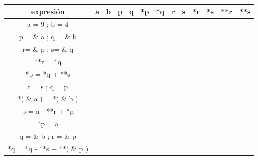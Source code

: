 \documentclass[12pt]{article} %
\begin{document}
   \begin{center}
   \begin{tabular}{| c | c | c | c | c | c | c | c | c | c | c | c | c |}
    \hline
     expresión 					& a & b & p & q & *p & *q & r & s & *r & *s & **r & **s \\ \hline 
     a = 9 ; b = 4   			&   &   &   &   &    &    &   &   &    &    &     &     \\ \hline 
     p = \& a ; q = \& b  		&   &   &   &   &    &    &   &   &    &    &     &     \\ \hline 
     r= \& p ; s= \& q			&   &   &   &   &    &    &   &   &    &    &     &     \\ \hline 
     **r = *q  					&   &   &   &   &    &    &   &   &    &    &     &     \\ \hline 
     *p = *q + **s		   		&   &   &   &   &    &    &   &   &    &    &     &     \\ \hline 
     r = s ; q = p				&   &   &   &   &    &    &   &   &    &    &     &     \\ \hline 
     *( \& a ) = *( \& b )		&   &   &   &   &    &    &   &   &    &    &     &     \\ \hline 
     b = a - **r + *p			&   &   &   &   &    &    &   &   &    &    &     &     \\ \hline 
     *p = a	   					&   &   &   &   &    &    &   &   &    &    &     &     \\ \hline 
     q = \& b ; r = \& p		&   &   &   &   &    &    &   &   &    &    &     &     \\ \hline 
     *q = *q - **s + **( \& p )	&   &   &   &   &    &    &   &   &    &    &     &     \\ \hline 
   \end{tabular}	
  \end{center}
\noindent
 
\end{document}
